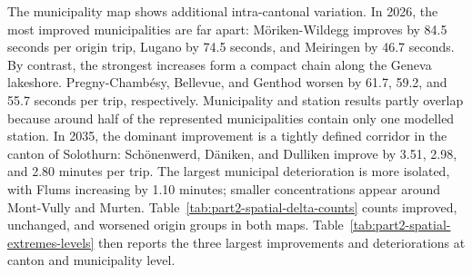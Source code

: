 \documentclass[preprint,12pt]{elsarticle}
\begin{document}
The municipality map shows additional intra-cantonal variation. In 2026, the most improved municipalities are far apart: Möriken-Wildegg improves by 84.5 seconds per origin trip, Lugano by 74.5 seconds, and Meiringen by 46.7 seconds. By contrast, the strongest increases form a compact chain along the Geneva lakeshore. Pregny-Chambésy, Bellevue, and Genthod worsen by 61.7, 59.2, and 55.7 seconds per trip, respectively. Municipality and station results partly overlap because around half of the represented municipalities contain only one modelled station. In 2035, the dominant improvement is a tightly defined corridor in the canton of Solothurn: Schönenwerd, Däniken, and Dulliken improve by 3.51, 2.98, and 2.80 minutes per trip. The largest municipal deterioration is more isolated, with Flums increasing by 1.10 minutes; smaller concentrations appear around Mont-Vully and Murten. Table~\ref{tab:part2-spatial-delta-counts} counts improved, unchanged, and worsened origin groups in both maps. Table~\ref{tab:part2-spatial-extremes-levels} then reports the three largest improvements and deteriorations at canton and municipality level.

\clearpage
\end{document}
